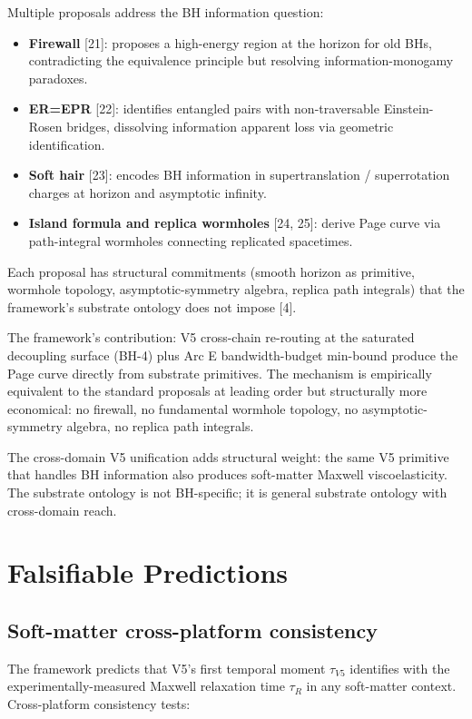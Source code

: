 \documentclass[11pt,a4paper]{article}
\begin{document}
Multiple proposals address the BH information question:

\begin{itemize}[noitemsep]
\item \textbf{Firewall} [21]: proposes a high-energy region at the horizon for old BHs, contradicting the equivalence principle but resolving information-monogamy paradoxes.
\item \textbf{ER=EPR} [22]: identifies entangled pairs with non-traversable Einstein-Rosen bridges, dissolving information apparent loss via geometric identification.
\item \textbf{Soft hair} [23]: encodes BH information in supertranslation / superrotation charges at horizon and asymptotic infinity.
\item \textbf{Island formula and replica wormholes} [24, 25]: derive Page curve via path-integral wormholes connecting replicated spacetimes.
\end{itemize}

Each proposal has structural commitments (smooth horizon as primitive, wormhole topology, asymptotic-symmetry algebra, replica path integrals) that the framework's substrate ontology does not impose [4].

The framework's contribution: V5 cross-chain re-routing at the saturated decoupling surface (BH-4) plus Arc E bandwidth-budget min-bound produce the Page curve directly from substrate primitives. The mechanism is empirically equivalent to the standard proposals at leading order but structurally more economical: no firewall, no fundamental wormhole topology, no asymptotic-symmetry algebra, no replica path integrals.

The cross-domain V5 unification adds structural weight: the same V5 primitive that handles BH information also produces soft-matter Maxwell viscoelasticity. The substrate ontology is not BH-specific; it is general substrate ontology with cross-domain reach.

\section{Falsifiable Predictions}

\subsection{Soft-matter cross-platform consistency}

The framework predicts that V5's first temporal moment $\tau_{V5}$ identifies with the experimentally-measured Maxwell relaxation time $\tau_R$ in any soft-matter context. Cross-platform consistency tests:
\end{document}
